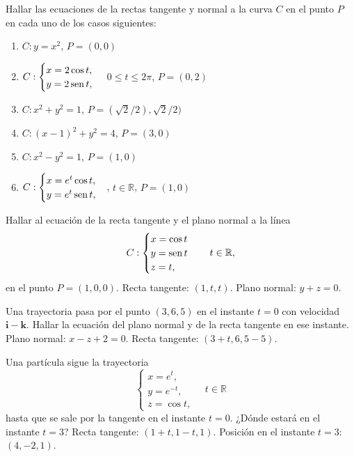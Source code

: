 {Hallar las ecuaciones de la rectas tangente y normal a la curva $C$ en el punto $P$ en cada uno de los casos siguientes:
\begin{enumerate}
\item $C: y=x^2$, $P=(0,0)$
\item $C: \begin{cases}
x=2\cos t,\\
y=2\operatorname{sen} t,
\end{cases}
$ $0\leq t\leq 2\pi$, $P=(0,2)$
\item $C:x^2+y^2=1$, $P=(\sqrt{2}/2),\sqrt{2}/2)$
\item $C:(x-1)^2+y^2=4$, $P=(3,0)$
\item $C:x^2-y^2=1$, $P=(1,0)$
\item $C:\begin{cases}
x=e^t\cos t,\\
y=e^t\operatorname{sen} t,
\end{cases}
$, $t\in \mathbb{R}$, $P=(1,0)$
\end{enumerate}
}
{
}
{
}


{Hallar al ecuación de la recta tangente y el plano normal a la línea
\[
C:
\begin{cases}
x=\cos t \\
y=\operatorname{sen} t\\
z= t,
\end{cases}
\quad t\in \mathbb{R},
\]
en el punto $P=(1,0,0)$.
}
{Recta tangente: $(1,t,t)$. Plano normal: $y+z=0$.
}
{
}


{Una trayectoria pasa por el punto $(3,6,5)$ en el instante $t=0$ con velocidad $\mathbf{i}-\mathbf{k}$.
Hallar la ecuación del plano normal y de la recta tangente en ese instante.
}
{Plano normal: $x-z+2=0$. Recta tangente: $(3+t,6,5-5)$.
}
{
}


{Una partícula sigue la trayectoria
\[
\begin{cases}
x=e^t,\\
y=e^{-t},\\
z=\cos t,
\end{cases}
\quad t\in \mathbb{R}
\]
hasta que se sale por la tangente en el instante $t=0$. ¿Dónde estará en el instante $t=3$?
}
{Recta tangente: $(1+t,1-t,1)$. Posición en el instante $t=3$: $(4,-2,1)$.
}
{
}
